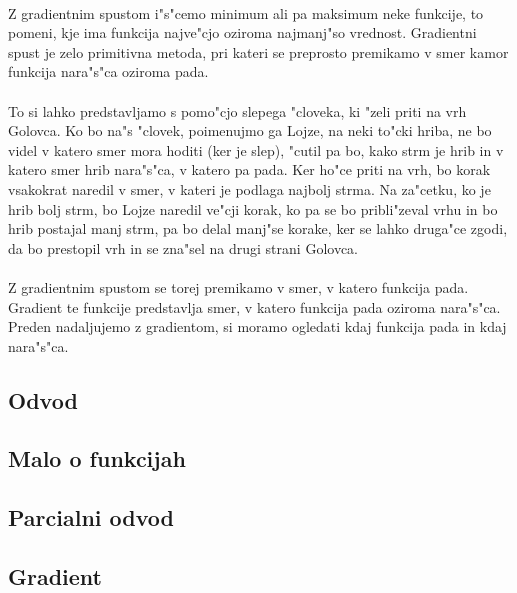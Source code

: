 \paragraph{}
Z gradientnim spustom i"s"cemo minimum ali pa maksimum neke funkcije, to pomeni, kje ima funkcija najve"cjo oziroma najmanj"so vrednost. Gradientni spust je zelo primitivna metoda, pri kateri se preprosto premikamo v smer kamor funkcija nara"s"ca oziroma pada.

\paragraph{}
To si lahko predstavljamo s pomo"cjo slepega "cloveka, ki "zeli priti na vrh Golovca. Ko bo na"s "clovek, poimenujmo ga Lojze, na neki to"cki hriba, ne bo videl v katero smer mora hoditi (ker je slep), "cutil pa bo, kako strm je hrib in v katero smer hrib nara"s"ca, v katero pa pada. Ker ho"ce priti na vrh, bo korak vsakokrat naredil v smer, v kateri je podlaga najbolj strma. Na za"cetku, ko je hrib bolj strm, bo Lojze naredil ve"cji korak, ko pa se bo pribli"zeval vrhu in bo hrib postajal manj strm, pa bo delal manj"se korake, ker se lahko druga"ce zgodi, da bo prestopil vrh in se zna"sel na drugi strani Golovca.

\paragraph{}
Z gradientnim spustom se torej premikamo v smer, v katero funkcija pada. Gradient te funkcije predstavlja smer, v katero funkcija pada oziroma nara"s"ca. Preden nadaljujemo z gradientom, si moramo ogledati kdaj funkcija pada in kdaj nara"s"ca.

\subsection*{Odvod}


\subsection*{Malo o funkcijah}


\subsection*{Parcialni odvod}


\subsection*{Gradient}

